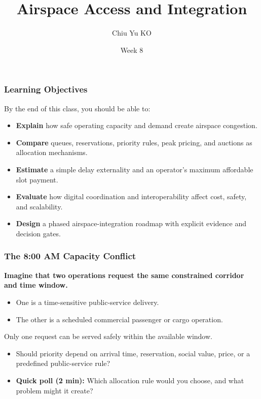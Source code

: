 \documentclass{beamer}
\begin{document}
\begin{frame}
  \title{Airspace Access and Integration}
  \author{Chiu Yu KO}
  \date{Week 8}
  \titlepage
\end{frame}


\begin{frame}[t]
\frametitle{Learning Objectives}
By the end of this class, you should be able to:
\begin{itemize}
\item \textbf{Explain} how safe operating capacity and demand create airspace congestion.
\item \textbf{Compare} queues, reservations, priority rules, peak pricing, and auctions as allocation mechanisms.
\item \textbf{Estimate} a simple delay externality and an operator's maximum affordable slot payment.
\item \textbf{Evaluate} how digital coordination and interoperability affect cost, safety, and scalability.
\item \textbf{Design} a phased airspace-integration roadmap with explicit evidence and decision gates.
\end{itemize}
\end{frame}

\begin{frame}[t]
\frametitle{The 8:00 AM Capacity Conflict}
\textbf{Imagine that two operations request the same constrained corridor and time window.}
\begin{itemize}
\item One is a time-sensitive public-service delivery.
\item The other is a scheduled commercial passenger or cargo operation.
\end{itemize}
\vspace{0.3cm}
Only one request can be served safely within the available window.
\begin{itemize}
\item Should priority depend on arrival time, reservation, social value, price, or a predefined public-service rule?
\item \textbf{Quick poll (2 min):} Which allocation rule would you choose, and what problem might it create?
\end{itemize}
\end{frame}
\end{document}
